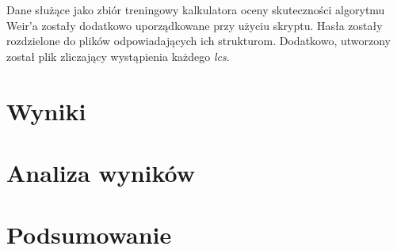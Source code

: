 \documentclass{article}
\begin{document}
	
	Dane służące jako zbiór treningowy kalkulatora oceny skuteczności algorytmu Weir'a zostały dodatkowo uporządkowane przy użyciu skryptu. Hasła zostały rozdzielone do plików odpowiadających ich strukturom. Dodatkowo, utworzony został plik zliczający wystąpienia każdego \textit{lcs}.
	
	\section{Wyniki}
	
	\section{Analiza wyników}
	
	\section{Podsumowanie}
	
	\newpage
	
	
\end{document}
